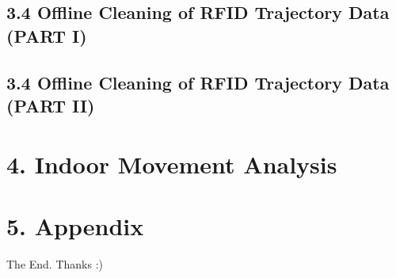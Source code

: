 \documentclass{beamer}
\begin{document}
% 
% 

\subsection{3.4 Offline Cleaning of RFID Trajectory Data (PART I)} %




\subsection{3.4 Offline Cleaning of RFID Trajectory Data (PART II)} %
%
% 
% 

\section{4. Indoor Movement Analysis} %

\section{5. Appendix} %

%



\begin{frame}
\Huge{\centerline{The End. Thanks :)}}
\end{frame}

\end{document}
